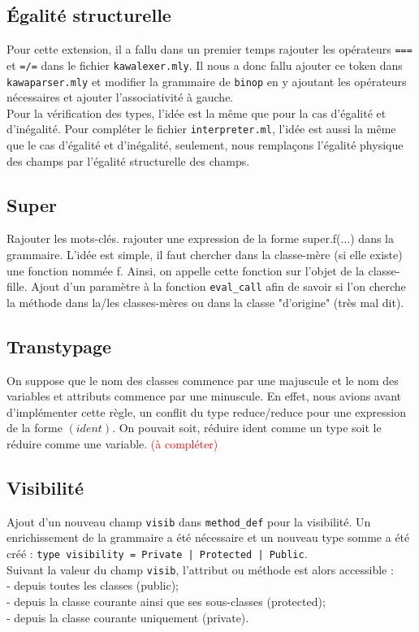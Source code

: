 \documentclass{article}
\begin{document}
\subsection{Égalité structurelle}
Pour cette extension, il a fallu dans un premier temps rajouter les opérateurs \texttt{===} et \texttt{=/=} dans le fichier \texttt{kawalexer.mly}. Il nous a donc fallu ajouter ce token dans \texttt{kawaparser.mly} et modifier la grammaire de \texttt{binop} en y ajoutant les opérateurs nécessaires et ajouter l'associativité à gauche. \\
Pour la vérification des types, l'idée est la même que pour la cas d'égalité et d'inégalité.
Pour compléter le fichier \texttt{interpreter.ml}, l'idée est aussi la même que le cas d'égalité et d'inégalité, seulement, nous remplaçons l'égalité physique des champs par l'égalité structurelle des champs.
\subsection{Super}
Rajouter les mots-clés. rajouter une expression de la forme super.f($\ldots$) dans la grammaire. L'idée est simple, il faut chercher dans la classe-mère (si elle existe) une fonction nommée f. Ainsi, on appelle cette fonction sur l'objet de la classe-fille. Ajout d'un paramètre à la fonction \texttt{eval\_call} afin de savoir si l'on cherche la méthode dans la/les classes-mères ou dans la classe "d'origine" (très mal dit).\\
\subsection{Transtypage}
On suppose que le nom des classes commence par une majuscule et le nom des variables et attributs commence par une minuscule. En effet, nous avions avant d'implémenter cette règle, un conflit du type reduce/reduce pour une expression de la forme $(ident)$. On pouvait soit, réduire ident comme un type soit le réduire comme une variable. \textcolor{red}{(à compléter)}
\subsection{Visibilité}
Ajout d'un nouveau champ \texttt{visib} dans \texttt{method\_def} pour la visibilité. Un enrichissement de la grammaire a été nécessaire et un nouveau type somme a été créé : \texttt{type visibility = Private | Protected | Public}.\\
Suivant la valeur du champ \texttt{visib}, l'attribut ou méthode est alors accessible :
\smallskip \\
- depuis toutes les classes (public);\\
- depuis la classe courante ainsi que ses sous-classes (protected);\\
- depuis la classe courante uniquement (private).
\end{document}
